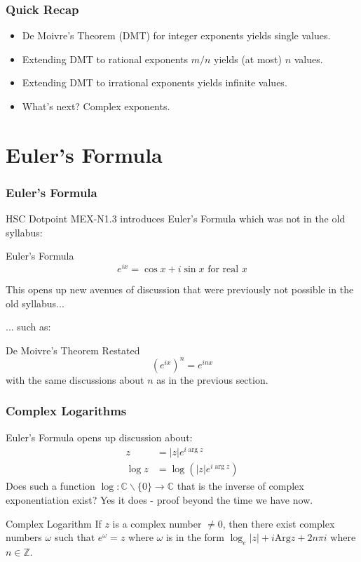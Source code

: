 \documentclass{beamer}
\begin{document}
\begin{frame}
  \frametitle{Quick Recap}
  \begin{itemize}
    \item<1-> De Moivre's Theorem (DMT) for integer exponents yields single values.
    \item<2-> Extending DMT to rational exponents $m/n$ yields (at most) $n$ values.
    \item<3-> Extending DMT to irrational exponents yields infinite values.
    \item<4-> What's next? Complex exponents.
  \end{itemize}
\end{frame}


\section{Euler's Formula}


\begin{frame}
  \frametitle{Euler's Formula}
  HSC Dotpoint MEX-N1.3 introduces Euler's Formula \parencite{syllabus} which was not in the old syllabus:
\begin{block}{Euler's Formula}
  \[ e^{ix} = \cos x + i \sin x \mbox{ for real } x\]
\end{block}
\pause
This opens up new avenues of discussion that were previously not possible in the old syllabus...

\pause
... such as:
\begin{block}{De Moivre's Theorem Restated}
  \[(e^{ix})^n = e^{inx}\]
  with the same discussions about $n$ as in the previous section.
\end{block}
\end{frame}

\begin{frame}
  \frametitle{Complex Logarithms}
  Euler's Formula opens up discussion about:
  \begin{align*}
    z &= |z|e^{i\arg z}\\
    \log z & = \log ( |z| e^{i\arg z} )
  \end{align*}
  \pause
  Does such a function $\log: \mathbb{C}\backslash\{0\} \rightarrow \mathbb{C}$ that is the inverse of complex exponentiation exist? Yes it does - proof beyond the time we have now.
  \pause
  \begin{block}{Complex Logarithm \parencite[p.~23]{apostol}}
    If $z$ is a complex number $\not = 0$, then there exist complex numbers $\omega$ such that $e^\omega = z$ where $\omega$ is in the form $\log_e|z| + i\mbox{Arg}z + 2n\pi i$ where $n\in\mathbb{Z}$.
  \end{block}
\end{frame}
\end{document}
